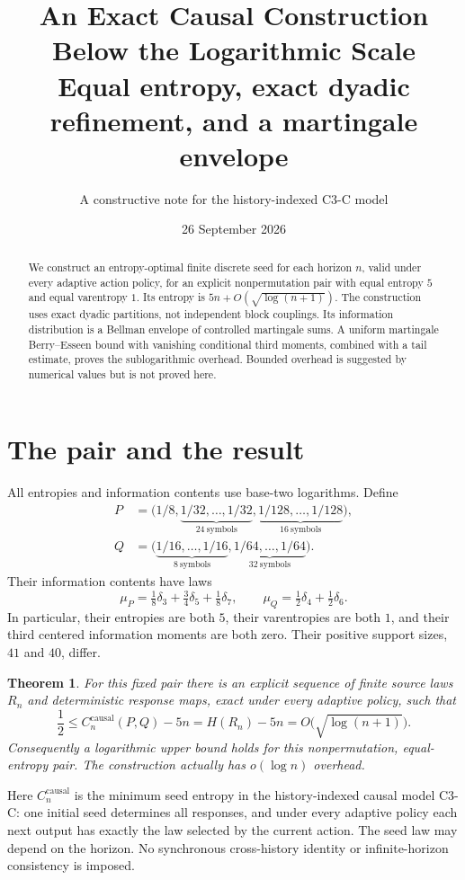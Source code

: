 \documentclass[11pt,a4paper]{article}
\title{An Exact Causal Construction Below the Logarithmic Scale\\[3pt]
\large Equal entropy, exact dyadic refinement, and a martingale envelope}
\author{A constructive note for the history-indexed C3-C model}
\date{26 September 2026}
\newtheorem{theorem}{Theorem}
\newcommand{\cc}{C_n^{\mathrm{causal}}}
\begin{document}
\maketitle
\begin{abstract}
We construct an entropy-optimal finite discrete seed for each horizon $n$, valid under every
adaptive action policy, for an explicit nonpermutation pair with equal
entropy $5$ and equal varentropy $1$. Its entropy is
$5n+O(\sqrt{\log(n+1)})$. The construction uses exact dyadic partitions,
not independent block couplings. Its information distribution is a Bellman
envelope of controlled martingale sums. A uniform martingale Berry--Esseen
bound with vanishing conditional third moments, combined with a tail
estimate, proves the sublogarithmic overhead. Bounded overhead is suggested
by numerical values but is not proved here.
\end{abstract}

\section{The pair and the result}
All entropies and information contents use base-two logarithms. Define
\begin{align*}
P&=\bigl(1/8,\underbrace{1/32,\ldots,1/32}_{24\ \mathrm{symbols}},
              \underbrace{1/128,\ldots,1/128}_{16\ \mathrm{symbols}}\bigr),\\
Q&=\bigl(\underbrace{1/16,\ldots,1/16}_{8\ \mathrm{symbols}},
              \underbrace{1/64,\ldots,1/64}_{32\ \mathrm{symbols}}\bigr).
\end{align*}
Their information contents have laws
\[
\mu_P=\tfrac18\delta_3+\tfrac34\delta_5+\tfrac18\delta_7,
\qquad \mu_Q=\tfrac12\delta_4+\tfrac12\delta_6.
\]
In particular, their entropies are both $5$, their varentropies are both
$1$, and their third centered information moments are both zero.
Their positive support sizes, $41$ and $40$, differ.

\begin{theorem}\label{thm:main}
For this fixed pair there is an explicit sequence of finite source laws
$R_n$ and deterministic response maps, exact under every adaptive policy,
such that
\[
\boxed{\frac12\le \cc(P,Q)-5n
= H(R_n)-5n=O\bigl(\sqrt{\log(n+1)}\bigr).}
\]
Consequently a logarithmic upper bound holds for this nonpermutation,
equal-entropy pair. The construction actually has $o(\log n)$ overhead.
\end{theorem}

Here $\cc$ is the minimum seed entropy in the history-indexed causal
model C3-C: one initial seed determines all responses, and under every
adaptive policy each next output has exactly the law selected by the
current action. The seed law may depend on the horizon. No synchronous
cross-history identity or infinite-horizon consistency is imposed.
\end{document}
